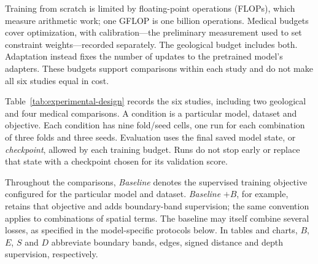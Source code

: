 \documentclass[12pt,a4paper]{article}
\begin{document}
Training from scratch is limited by floating-point operations (FLOPs),
which measure arithmetic work; one GFLOP is one billion operations.
Medical budgets cover optimization, with calibration---the preliminary
measurement used to set constraint weights---recorded separately. The
geological budget includes both. Adaptation instead fixes the number
of updates to the pretrained model's adapters. These budgets support
comparisons within each study and do not make all six studies equal in cost.

Table~\ref{tab:experimental-design} records the six studies, including two
geological and four medical comparisons. A condition is a particular model,
dataset and objective. Each condition has nine fold/seed cells, one run for
each combination of three folds and three seeds. Evaluation uses the
final saved model state, or \emph{checkpoint},
allowed by each training budget. Runs do not stop early or replace that
state with a checkpoint chosen for its validation score.

Throughout the comparisons, \emph{Baseline} denotes the supervised training
objective configured for the particular model and dataset. \emph{Baseline}
$+B$, for example, retains that objective and adds boundary-band
supervision; the same convention applies to combinations of spatial terms.
The baseline may itself combine several losses, as specified in the
model-specific protocols below. In tables and charts, $B$, $E$, $S$ and $D$
abbreviate boundary bands, edges, signed distance and depth supervision,
respectively.
\end{document}
